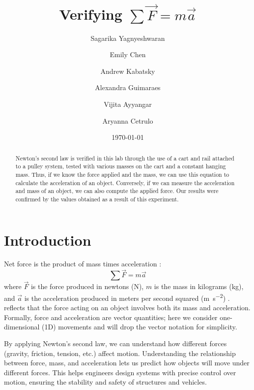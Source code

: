 \documentclass[reprint,amsmath,amssymb,prl]{revtex4-2}
\begin{document}
\title{Verifying $\sum\vec{F} = m\vec{a}$}

\author{Sagarika Yagnyeshwaran}
\author{Emily Chen}
\author{Andrew Kabatsky}
\author{Alexandra Guimaraes}
\author{Vijita Ayyangar}
\author{Aryanna Cetrulo}
\date{\today}

\begin{abstract}
Newton’s second law is verified in this lab through the use of a cart and rail attached to a pulley system, tested with various masses on the cart and a constant hanging mass. Thus, if we know the force applied and the mass, we can use this equation to calculate the acceleration of an object. Conversely, if we can measure the acceleration and mass of an object, we can also compute the applied force. Our results were confirmed by the values obtained as a result of this experiment.
\end{abstract}


\maketitle





\section{Introduction}
Net force is the product of mass times acceleration \cite{newton1687principia}:
\begin{equation} 
\sum \vec{F} = m\vec{a}
\label{eq:1}
\end{equation}
where $\vec{F}$ is the force produced in newtons (\unit{\newton}), $m$ is the mass in kilograms (\unit{\kilo\gram}), and $\vec{a}$ is the acceleration produced in meters per second squared (\unit{\meter\per\second\squared}) \cite{newton1687principia}.  reflects that the force acting on an object involves both its mass and acceleration. Formally, force and acceleration are vector quantities; here we consider one-dimensional (1D) movements and will drop the vector notation for simplicity. 

By applying Newton's second law, we can understand how different forces (gravity, friction, tension, etc.) affect motion. Understanding the relationship between force, mass, and acceleration lets us predict how objects will move under different forces. This helps engineers design systems with precise control over motion, ensuring the stability and safety of structures and vehicles.
\end{document}
